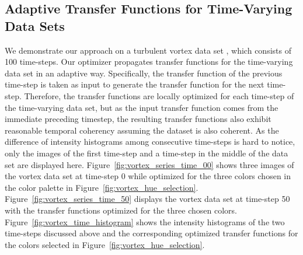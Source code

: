 \subsection{Adaptive Transfer Functions for Time-Varying Data Sets}
We demonstrate our approach on a turbulent vortex data set \cite{website:Ma_repository_2013}, which consists of 100 time-steps. Our optimizer propagates transfer functions for the time-varying data set in an adaptive way. Specifically, the transfer function of the previous time-step is taken as input to generate the transfer function for the next time-step.
Therefore, the transfer functions are locally optimized for each time-step of the time-varying data set, but as the input transfer function comes from the immediate preceding timestep, the resulting transfer functions also exhibit reasonable temporal coherency assuming the dataset is also coherent.
As the difference of intensity histograms among consecutive time-steps is hard to notice, only the images of the first time-step and a time-step in the middle of the data set are displayed here.
Figure~\ref{fig:vortex_series_time_00} shows three images of the vortex data set at time-step 0 while optimized for the three colors chosen in the color palette in Figure~\ref{fig:vortex_hue_selection}.
Figure~\ref{fig:vortex_series_time_50} displays the vortex data set at time-step 50 with the transfer functions optimized for the three chosen colors.
Figure~\ref{fig:vortex_time_histogram} shows the intensity histograms of the two time-steps discussed above and the corresponding optimized transfer functions for the colors selected in Figure~\ref{fig:vortex_hue_selection}.

